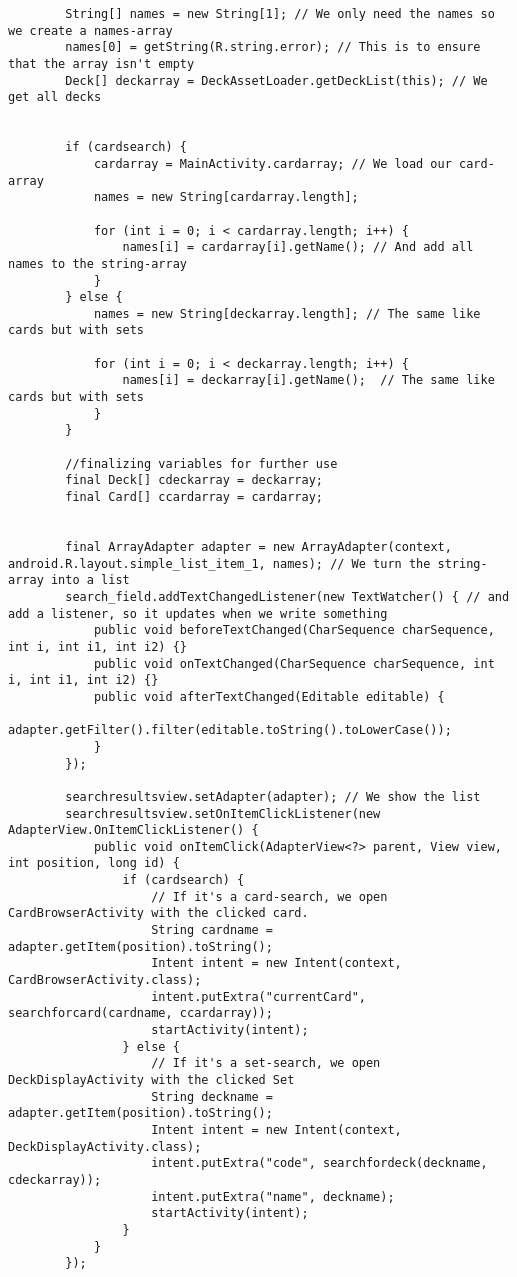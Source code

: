 \begin{lstlisting}
        String[] names = new String[1]; // We only need the names so we create a names-array
        names[0] = getString(R.string.error); // This is to ensure that the array isn't empty
        Deck[] deckarray = DeckAssetLoader.getDeckList(this); // We get all decks


        if (cardsearch) {
            cardarray = MainActivity.cardarray; // We load our card-array
            names = new String[cardarray.length];

            for (int i = 0; i < cardarray.length; i++) {
                names[i] = cardarray[i].getName(); // And add all names to the string-array
            }
        } else {
            names = new String[deckarray.length]; // The same like cards but with sets

            for (int i = 0; i < deckarray.length; i++) {
                names[i] = deckarray[i].getName();  // The same like cards but with sets
            }
        }

        //finalizing variables for further use
        final Deck[] cdeckarray = deckarray;
        final Card[] ccardarray = cardarray;


        final ArrayAdapter adapter = new ArrayAdapter(context, android.R.layout.simple_list_item_1, names); // We turn the string-array into a list
        search_field.addTextChangedListener(new TextWatcher() { // and add a listener, so it updates when we write something
            public void beforeTextChanged(CharSequence charSequence, int i, int i1, int i2) {}
            public void onTextChanged(CharSequence charSequence, int i, int i1, int i2) {}
            public void afterTextChanged(Editable editable) {
                adapter.getFilter().filter(editable.toString().toLowerCase());
            }
        });

        searchresultsview.setAdapter(adapter); // We show the list
        searchresultsview.setOnItemClickListener(new AdapterView.OnItemClickListener() {
            public void onItemClick(AdapterView<?> parent, View view, int position, long id) {
                if (cardsearch) {
                    // If it's a card-search, we open CardBrowserActivity with the clicked card.
                    String cardname = adapter.getItem(position).toString();
                    Intent intent = new Intent(context, CardBrowserActivity.class);
                    intent.putExtra("currentCard", searchforcard(cardname, ccardarray));
                    startActivity(intent);
                } else {
                    // If it's a set-search, we open DeckDisplayActivity with the clicked Set
                    String deckname = adapter.getItem(position).toString();
                    Intent intent = new Intent(context, DeckDisplayActivity.class);
                    intent.putExtra("code", searchfordeck(deckname, cdeckarray));
                    intent.putExtra("name", deckname);
                    startActivity(intent);
                }
            }
        });


\end{lstlisting}
